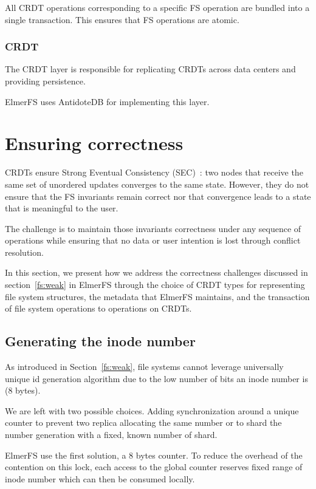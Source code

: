 \documentclass[sigconf, 10pt]{acmart}
\begin{document}
All CRDT operations corresponding to a specific FS operation are bundled into
a single transaction. This ensures that FS operations are atomic.

\subsubsection{CRDT}

The CRDT layer is responsible for replicating CRDTs across data centers
and providing persistence.

ElmerFS uses AntidoteDB\cite{akkoorath2016cure, akkoorath2016antidote} for implementing this layer.

\section{Ensuring correctness}

CRDTs ensure Strong Eventual Consistency (SEC)~\cite{shapiro2011conflict}: two nodes that receive the same set of unordered updates converges to the 
same state. However, they do not ensure that the FS invariants remain correct nor that convergence leads to a state that is meaningful to the user.

The challenge is to maintain those invariants correctness under any sequence of operations while ensuring that no data or user intention is lost through conflict resolution.

In this section, we present how we address the correctness challenges discussed in section~\ref{fs:weak}
in ElmerFS through the choice of CRDT types for representing file system structures,
the metadata that ElmerFS maintains, and the transaction of file system operations
to operations on CRDTs.

\subsection{Generating the inode number}
\label{sec:generation_inode_number}

As introduced in Section~\ref{fs:weak}, file systems cannot leverage
universally unique id generation algorithm due to the low number of bits
an inode number is (8 bytes).

We are left with two possible choices. Adding synchronization around a unique
counter to prevent two replica allocating the same number or to shard the number generation
with a fixed, known number of shard.

ElmerFS use the first solution, a 8 bytes counter.
To reduce the overhead of the contention on this lock, each access to the global counter reserves fixed range of inode number which can then be consumed locally.
\end{document}
